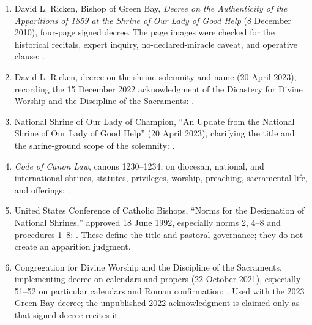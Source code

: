 \begin{enumerate}
  \item David L. Ricken, Bishop of Green Bay, \emph{Decree on the Authenticity of the Apparitions of 1859 at the Shrine of Our Lady of Good Help} (8 December 2010), four-page signed decree. The page images were checked for the historical recitals, expert inquiry, no-declared-miracle caveat, and operative clause: .
  \item David L. Ricken, decree on the shrine solemnity and name (20 April 2023), recording the 15 December 2022 acknowledgment of the Dicastery for Divine Worship and the Discipline of the Sacraments: .
  \item National Shrine of Our Lady of Champion, “An Update from the National Shrine of Our Lady of Good Help” (20 April 2023), clarifying the title and the shrine-ground scope of the solemnity: .
  \item \emph{Code of Canon Law}, canons 1230--1234, on diocesan, national, and international shrines, statutes, privileges, worship, preaching, sacramental life, and offerings: .
  \item United States Conference of Catholic Bishops, “Norms for the Designation of National Shrines,” approved 18 June 1992, especially norms 2, 4--8 and procedures 1--8: . These define the title and pastoral governance; they do not create an apparition judgment.
  \item Congregation for Divine Worship and the Discipline of the Sacraments, implementing decree on calendars and propers (22 October 2021), especially 51--52 on particular calendars and Roman confirmation: . Used with the 2023 Green Bay decree; the unpublished 2022 acknowledgment is claimed only as that signed decree recites it.
\end{enumerate}

